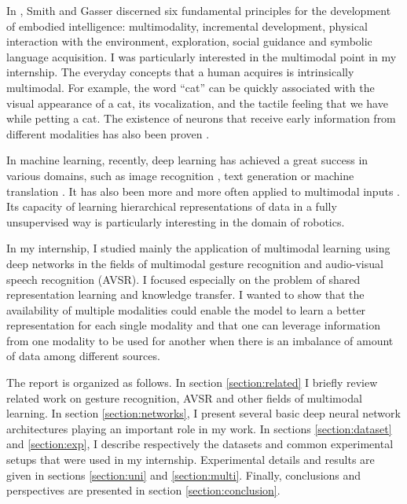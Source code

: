 In \cite{L. Smith 2005}, Smith and Gasser discerned six fundamental
principles for the development of embodied intelligence: multimodality,
incremental development, physical interaction with the environment,
exploration, social guidance and symbolic language acquisition.
I was particularly interested in the multimodal point in my internship.
The everyday concepts that a human acquires is intrinsically multimodal.
For example, the word ``cat'' can be quickly associated with the visual
appearance of a cat, its vocalization, and the tactile feeling that
we have while petting a cat. The existence of neurons that receive
early information from different modalities has also been proven
\cite{S. Molholm 2002}.

In machine learning, recently, deep learning has achieved a great success in
various domains, such as image recognition \cite{A. Krizhevsky 2012},
text generation \cite{A. Graves 2013} or
machine translation \cite{I. Sutskever 2014}.
It has also been more and more often applied to multimodal inputs
\cite{J. Ngiam 2011, T. Baltrusaitis 2017}.
Its capacity of learning hierarchical representations of data in a
fully unsupervised way \cite{P. Vincent 2010, A. Radford 2015}
is particularly interesting in the domain of robotics.

In my internship, I studied mainly the application of multimodal learning
using deep networks in the fields of multimodal gesture recognition
and audio-visual speech recognition (AVSR).
I focused especially on the problem
of shared representation learning and knowledge transfer. I wanted to show
that the availability of multiple modalities could enable the model
to learn a better representation for each single modality and that one can
leverage information from one modality to be used for another when there
is an imbalance of amount of data among different sources.

The report is organized as follows. In section \ref{section:related} I
briefly review related work on gesture recognition, AVSR and other
fields of multimodal learning.
In section \ref{section:networks}, I present
several basic deep neural network architectures playing an important
role in my work. In sections \ref{section:dataset} and
\ref{section:exp}, I describe respectively the datasets and common
experimental setups that were used in my internship. Experimental
details and results are given in sections \ref{section:uni} and
\ref{section:multi}. Finally, conclusions and perspectives are
presented in section \ref{section:conclusion}.

